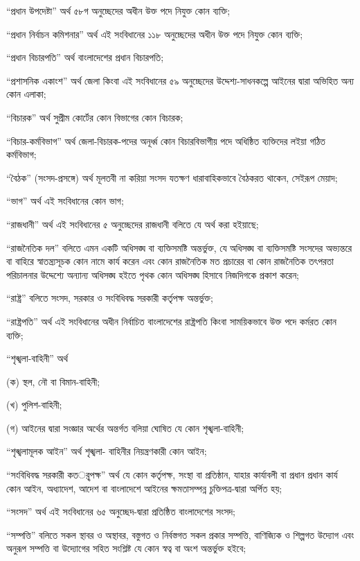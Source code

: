 \documentclass[11pt]{article}
\begin{document}
“প্রধান উপদেষ্টা” অর্থ ৫৮গ অনুচ্ছেদের অধীন উক্ত পদে নিযুক্ত কোন ব্যক্তি;

“প্রধান নির্বাচন কমিশনার” অর্থ এই সংবিধানের ১১৮ অনুচ্ছেদের অধীন উক্ত পদে
নিযুক্ত কোন ব্যক্তি;

“প্রধান বিচারপতি” অর্থ বাংলাদেশের প্রধান বিচারপতি;

“প্রশাসনিক একাংশ” অর্থ জেলা কিংবা এই সংবিধানের ৫৯ অনুচ্ছেদের
উদ্দেশ্য-সাধনকল্পে আইনের দ্বারা অভিহিত অন্য কোন এলাকা;

“বিচারক” অর্থ সুপ্রীম কোর্টের কোন বিভাগের কোন বিচারক;

“বিচার-কর্মবিভাগ” অর্থ জেলা-বিচারক-পদের অনূর্ধ্ব কোন বিচারবিভাগীয় পদে
অধিষ্ঠিত ব্যক্তিদের লইয়া গঠিত কর্মবিভাগ;

“বৈঠক” (সংসদ-প্রসঙ্গে) অর্থ মূলতবী না করিয়া সংসদ যতক্ষণ ধারাবাহিকভাবে
বৈঠকরত থাকেন, সেইরূপ মেয়াদ;

“ভাগ” অর্থ এই সংবিধানের কোন ভাগ;

“রাজধানী” অর্থ এই সংবিধানের ৫ অনুচ্ছেদের রাজধানী বলিতে যে অর্থ করা হইয়াছে;

“রাজনৈতিক দল” বলিতে এমন একটি অধিসঙ্ঘ বা ব্যক্তিসমষ্টি অন্তর্ভুক্ত, যে অধিসঙ্ঘ
বা ব্যক্তিসমষ্টি সংসদের অভ্যন্তরে বা বাহিরে স্বাতন্ত্র্যসূচক কোন নামে কার্য করেন
এবং কোন রাজনৈতিক মত প্রচারের বা কোন রাজনৈতিক তৎপরতা পরিচালনার উদ্দেশ্যে
অন্যান্য অধিসঙ্ঘ হইতে পৃথক কোন অধিসঙ্ঘ হিসাবে নিজদিগকে প্রকাশ করেন;

“রাষ্ট্র” বলিতে সংসদ, সরকার ও সংবিধিবদ্ধ সরকারী কর্তৃপক্ষ অন্তর্ভুক্ত;

“রাষ্ট্রপতি” অর্থ এই সংবিধানের অধীন নির্বাচিত বাংলাদেশের রাষ্ট্রপতি কিংবা
সাময়িকভাবে উক্ত পদে কর্মরত কোন ব্যক্তি;

“শৃঙ্খলা-বাহিনী” অর্থ

(ক) স্থল, নৌ বা বিমান-বাহিনী;

(খ) পুলিশ-বাহিনী;

(গ) আইনের দ্বারা সংজ্ঞার অর্থের অন্তর্গত বলিয়া ঘোষিত যে কোন শৃঙ্খলা-বাহিনী;

“শৃঙ্খলামূলক আইন” অর্থ শৃঙ্খলা- বাহিনীর নিয়ন্ত্রণকারী কোন আইন;

“সংবিধিবদ্ধ সরকারী কতর্ৃপক্ষ” অর্থ যে কোন কর্তৃপক্ষ, সংস্থা বা প্রতিষ্ঠান, যাহার
কার্যাবলী বা প্রধান প্রধান কার্য কোন আইন, অধ্যাদেশ, আদেশ বা বাংলাদেশে আইনের
ক্ষমতাসম্পন্ন চুক্তিপত্র-দ্বারা অর্পিত হয়;

“সংসদ” অর্থ এই সংবিধানের ৬৫ অনুচ্ছেদ-দ্বারা প্রতিষ্ঠিত বাংলাদেশের সংসদ;

“সম্পত্তি” বলিতে সকল স্থাবর ও অস্থাবর, বস্তুগত ও নির্বস্তগত সকল প্রকার সম্পত্তি,
বাণিজ্যিক ও শিল্পগত উদ্যোগ এবং অনুরূপ সম্পত্তি বা উদ্যোগের সহিত সংশ্লিষ্ট যে কোন
স্বত্ব বা অংশ অন্তর্ভুক্ত হইবে;
\end{document}

